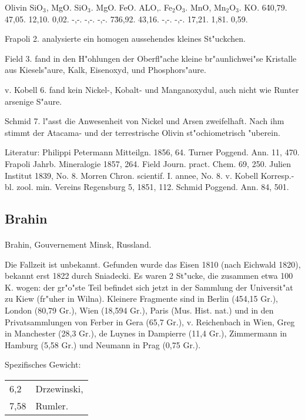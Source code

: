 \documentclass[a4paper, 11pt, oneside]{article}
\begin{document}
Olivin { SiO$_{3}$, MgO. }  
SiO$_{3}$. MgO. FeO. ALO,. Fe$_{2}$O$_{3}$. MnO, Mn$_{2}$O$_{3}$. KO.  
6\. 40,79. 47,05. 12,10. 0,02. -,-. -,-. -,-.  
7\. 36,92. 43,16. -,-. -,-. 17,21. 1,81. 0,59.

Frapoli 2. analysierte ein homogen aussehendes kleines St"uckchen.

Field 3. fand in den H"ohlungen der Oberfl"ache kleine br"aunlichwei"se Kristalle aus Kiesels"aure, Kalk, Eisenoxyd, und Phosphors"aure.

v. Kobell 6. fand kein Nickel-, Kobalt- und Manganoxydul, auch nicht wie Runter arsenige S"aure.

Schmid 7. l"asst die Anwesenheit von Nickel und Arsen zweifelhaft. Nach ihm stimmt der Atacama- und der terrestrische Olivin st"ochiometrisch "uberein.

Literatur: Philippi Petermann Mitteilgn. 1856, 64. Turner Poggend. Ann. 11, 470. Frapoli Jahrb. Mineralogie 1857, 264. Field Journ. pract. Chem. 69, 250. Julien Institut 1839, No. 8. Morren Chron. scientif. I. annee, No. 8. v. Kobell Korresp.-bl. zool. min. Vereins Regensburg 5, 1851, 112. Schmid Poggend. Ann. 84, 501.

\subsection{Brahin}
\normalsize
\paragraph{}
Brahin, Gouvernement Minsk, Russland.

Die Fallzeit ist unbekannt. Gefunden wurde das Eisen 1810 (nach Eichwald 1820), bekannt erst 1822 durch Sniadecki. Es waren 2 St"ucke, die zusammen etwa 100 K. wogen: der gr"o"ste Teil befindet sich jetzt in der Sammlung der Universit"at zu Kiew (fr"uher in Wilna). Kleinere Fragmente sind in Berlin (454,15 Gr.), London (80,79 Gr.), Wien (18,594 Gr.), Paris (Mus. Hist. nat.) und in den Privatsammlungen von Ferber in Gera (65,7 Gr.), v. Reichenbach in Wien, Greg in Manchester (28,3 Gr.), de Luynes in Dampierre (11,4 Gr.), Zimmermann in Hamburg (5,58 Gr.) und Neumann in Prag (0,75 Gr.).

Spezifisches Gewicht:  
\begin{table}[!ht]
    \centering
    \begin{tabular}{l l}
        6,2 & Drzewinski,\\
        7,58 & Rumler.
    \end{tabular}
\end{table}
\end{document}
